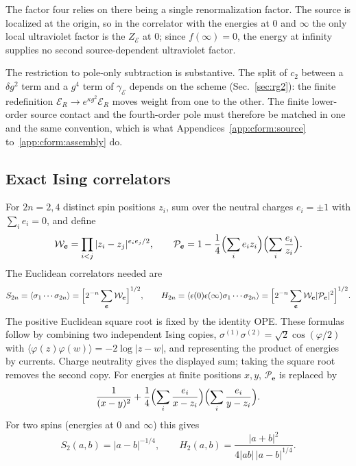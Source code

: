 \documentclass[11pt,a4paper]{article}
\numberwithin{equation}{section}
\begin{document}
The factor four relies on there being a single renormalization factor. The source is localized at the origin, so in
the correlator with the energies at $0$ and $\infty$ the only local ultraviolet factor is the $Z_{\mathcal E}$ at $0$;
since $f(\infty)=0$, the energy at infinity supplies no second source-dependent ultraviolet factor.

The restriction to pole-only subtraction is substantive. The split of $c_2$ between a $\delta g^2$ term and a $g^4$
term of $\gamma_{\mathcal E}$ depends on the scheme (Sec.~\ref{sec:rg2}): the finite redefinition
$\mathcal E_R\to e^{\kappa g^2}\mathcal E_R$ moves weight from one to the other. The finite lower-order source contact
and the fourth-order pole must therefore be matched in one and the same convention, which is what
Appendices~\ref{app:cform:source} to~\ref{app:cform:assembly} do.

\subsection{Exact Ising correlators}\label{app:cform:correlators}
For $2n=2,4$ distinct spin positions $z_i$, sum over the neutral charges $e_i=\pm1$ with $\sum_ie_i=0$, and define
\begin{equation}
 \mathcal W_{\boldsymbol e}=\prod_{i<j}|z_i-z_j|^{e_ie_j/2},\qquad
 \mathcal P_{\boldsymbol e}=1-\frac14\Bigl(\sum_ie_iz_i\Bigr)\Bigl(\sum_i\frac{e_i}{z_i}\Bigr).
\end{equation}
The Euclidean correlators needed are~\cite{Ardonne:2010zz}
\begin{equation}
 S_{2n}=\langle\sigma_1\cdots\sigma_{2n}\rangle=\Bigl[2^{-n}\sum_{\boldsymbol e}\mathcal W_{\boldsymbol e}\Bigr]^{1/2},\qquad
 H_{2n}=\langle\epsilon(0)\epsilon(\infty)\sigma_1\cdots\sigma_{2n}\rangle
 =\Bigl[2^{-n}\sum_{\boldsymbol e}\mathcal W_{\boldsymbol e}|\mathcal P_{\boldsymbol e}|^2\Bigr]^{1/2}.
 \label{eq:cform:neutral}
\end{equation}
The positive Euclidean square root is fixed by the identity OPE. These formulas follow by combining two independent
Ising copies, $\sigma^{(1)}\sigma^{(2)}=\sqrt2\cos(\varphi/2)$ with $\langle\varphi(z)\varphi(w)\rangle=-2\log|z-w|$,
and representing the product of energies by currents. Charge neutrality gives the displayed sum; taking the square
root removes the second copy. For energies at finite positions $x,y$, $\mathcal P_{\boldsymbol e}$ is replaced by
\begin{equation}
 \frac1{(x-y)^2}+\frac14\Bigl(\sum_i\frac{e_i}{x-z_i}\Bigr)\Bigl(\sum_i\frac{e_i}{y-z_i}\Bigr).
 \label{eq:cform:finiteenergy}
\end{equation}
For two spins (energies at $0$ and $\infty$) this gives
\begin{equation}
 S_2(a,b)=|a-b|^{-1/4},\qquad H_2(a,b)=\frac{|a+b|^2}{4|ab|\,|a-b|^{1/4}}.
 \label{eq:cform:twospin}
\end{equation}
\end{document}
